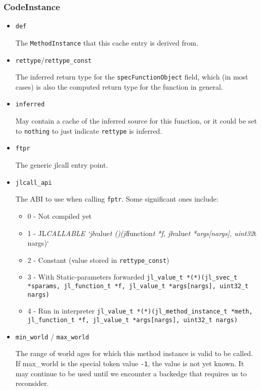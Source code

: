 \hypertarget{17684444820224515276}{}


\subsubsection{CodeInstance}



\begin{itemize}
\item \texttt{def}

The \texttt{MethodInstance} that this cache entry is derived from.

\end{itemize}


\begin{itemize}
\item \texttt{rettype}/\texttt{rettype\_const}

The inferred return type for the \texttt{specFunctionObject} field, which (in most cases) is also the computed return type for the function in general.


\item \texttt{inferred}

May contain a cache of the inferred source for this function, or it could be set to \texttt{nothing} to just indicate \texttt{rettype} is inferred.


\item \texttt{ftpr}

The generic jlcall entry point.


\item \texttt{jlcall\_api}

The ABI to use when calling \texttt{fptr}. Some significant ones include:

\begin{itemize}
\item 0 - Not compiled yet


\item 1 - JL\emph{CALLABLE `jl}value\emph{t \emph{(})(jl}function\emph{t *f, jl}value\emph{t *args[nargs], uint32}t nargs)`


\item 2 - Constant (value stored in \texttt{rettype\_const})


\item 3 - With Static-parameters forwarded \texttt{jl\_value\_t *(*)(jl\_svec\_t *sparams, jl\_function\_t *f, jl\_value\_t *args[nargs], uint32\_t nargs)}


\item 4 - Run in interpreter \texttt{jl\_value\_t *(*)(jl\_method\_instance\_t *meth, jl\_function\_t *f, jl\_value\_t *args[nargs], uint32\_t nargs)}

\end{itemize}

\item \texttt{min\_world} / \texttt{max\_world}

The range of world ages for which this method instance is valid to be called. If max\_world is the special token value \texttt{-1}, the value is not yet known. It may continue to be used until we encounter a backedge that requires us to reconsider.

\end{itemize}


